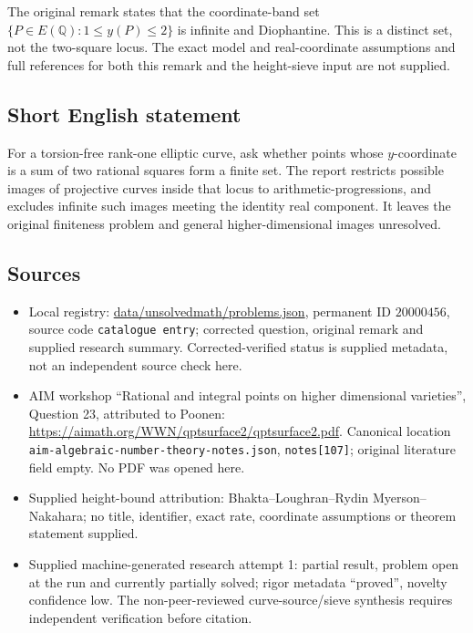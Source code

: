 \documentclass[11pt]{article}
\newcommand{\Q}{\mathbb{Q}}
\begin{document}
The original remark states that the coordinate-band set $\{P\in E(\Q):1\leq y(P)\leq2\}$ is infinite and Diophantine. This is a distinct set, not the two-square locus. The exact model and real-coordinate assumptions and full references for both this remark and the height-sieve input are not supplied.
\subsection{Short English statement}
For a torsion-free rank-one elliptic curve, ask whether points whose $y$-coordinate is a sum of two rational squares form a finite set. The report restricts possible images of projective curves inside that locus to arithmetic-progressions, and excludes infinite such images meeting the identity real component. It leaves the original finiteness problem and general higher-dimensional images unresolved.
\subsection{Sources}
\begin{itemize}
\item Local registry: \url{data/unsolvedmath/problems.json}, permanent ID $20000456$, source code \texttt{catalogue entry}; corrected question, original remark and supplied research summary. Corrected-verified status is supplied metadata, not an independent source check here.
\item AIM workshop ``Rational and integral points on higher dimensional varieties'', Question 23, attributed to Poonen: \url{https://aimath.org/WWN/qptsurface2/qptsurface2.pdf}. Canonical location \texttt{aim-algebraic-number-theory-notes.json}, \texttt{notes[107]}; original literature field empty. No PDF was opened here.
\item Supplied height-bound attribution: Bhakta--Loughran--Rydin Myerson--Nakahara; no title, identifier, exact rate, coordinate assumptions or theorem statement supplied.
\item Supplied machine-generated research attempt 1: partial result, problem open at the run and currently partially solved; rigor metadata ``proved'', novelty confidence low. The non-peer-reviewed curve-source/sieve synthesis requires independent verification before citation.
\end{itemize}
\end{document}
